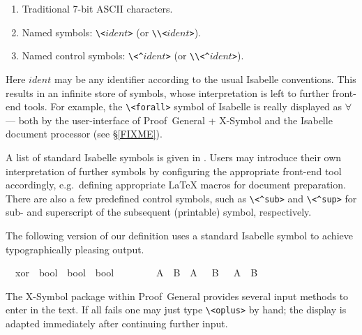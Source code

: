 \begin{isabellebody}
\begin{isamarkuptext}
  \begin{enumerate}

  \item Traditional 7-bit ASCII characters.

  \item Named symbols: \verb,\,\verb,<,$ident$\verb,>, (or
  \verb,\\,\verb,<,$ident$\verb,>,).

  \item Named control symbols: \verb,\,\verb,<^,$ident$\verb,>, (or
  \verb,\\,\verb,<^,$ident$\verb,>,).

  \end{enumerate}

  Here $ident$ may be any identifier according to the usual Isabelle
  conventions.  This results in an infinite store of symbols, whose
  interpretation is left to further front-end tools.  For example, the
  \verb,\,\verb,<forall>, symbol of Isabelle is really displayed as
  $\forall$ --- both by the user-interface of Proof~General + X-Symbol
  and the Isabelle document processor (see \S\ref{FIXME}).

  A list of standard Isabelle symbols is given in
  \cite[appendix~A]{isabelle-sys}.  Users may introduce their own
  interpretation of further symbols by configuring the appropriate
  front-end tool accordingly, e.g.\ defining appropriate {\LaTeX}
  macros for document preparation.  There are also a few predefined
  control symbols, such as \verb,\,\verb,<^sub>, and
  \verb,\,\verb,<^sup>, for sub- and superscript of the subsequent
  (printable) symbol, respectively.

  \medskip The following version of our  definition uses a
  standard Isabelle symbol to achieve typographically pleasing output.%
\end{isamarkuptext}%
\isamarkuptrue%
\isamarkupfalse%
\isamarkupfalse%
\isanewline
\ \ xor\ {\isacharcolon}{\isacharcolon}\ {\isachardoublequote}bool\ {\isasymRightarrow}\ bool\ {\isasymRightarrow}\ bool{\isachardoublequote}\ \ \ \ {\isacharparenleft}\ {\isachardoublequote}{\isasymoplus}{\isachardoublequote}\ {}{}{\isacharparenright}\isanewline
\ \ {\isachardoublequote}A\ {\isasymoplus}\ B\ {\isasymequiv}\ {\isacharparenleft}A\ {\isasymand}\ {\isasymnot}\ B{\isacharparenright}\ {\isasymor}\ {\isacharparenleft}{\isasymnot}\ A\ {\isasymand}\ B{\isacharparenright}{\isachardoublequote}\isamarkupfalse%
\isamarkupfalse%
%
\begin{isamarkuptext}%
The X-Symbol package within Proof~General provides several input
  methods to enter \isa{{\isasymoplus}} in the text.  If all fails one may just
  type \verb,\,\verb,<oplus>, by hand; the display is adapted
  immediately after continuing further input.


\end{isamarkuptext}
\end{isabellebody}
